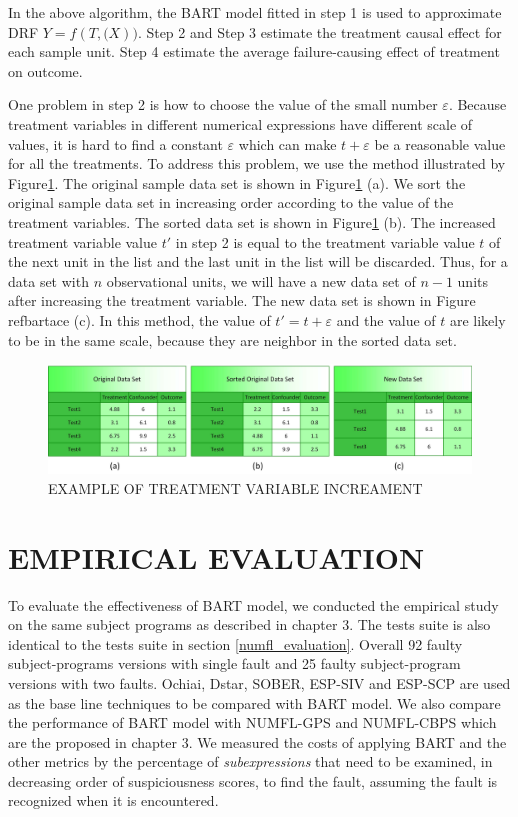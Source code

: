 In the above algorithm, the BART model fitted in step 1 is used to approximate DRF $Y=f(T,\pmb(X))$. Step 2 and Step 3 estimate the treatment causal effect for each sample unit. Step 4 estimate the average failure-causing effect of treatment on outcome.

One problem in step 2 is how to choose the value of the small number $\varepsilon $. Because treatment variables in different numerical expressions have different scale of values, it is hard to find a constant $\varepsilon$ which can make $t+\varepsilon$ be a reasonable value for all the treatments. To address this problem, we use the method illustrated by Figure\ref{bartace}.  The original sample data set is shown in Figure\ref{bartace} (a).  We sort the original sample data set in increasing order according to the value of the treatment variables. The sorted data set is shown in Figure\ref{bartace} (b). The increased treatment variable value $t'$ in step 2 is equal to the treatment variable value $t$ of the next unit in the list and the last unit in the list will be discarded. Thus,  for a data set with $n$ observational units, we will have a new data set of $n-1$ units after increasing the treatment variable. The new data set is shown in Figure ref{bartace} (c). In this method, the value of $t'=t+\varepsilon$ and the value of $t$ are likely to be in the same scale, because they are neighbor in the sorted data set. 

\begin{figure}[!thpb]
\centering
\includegraphics[width=1\textwidth]{chapter4_BART_ACE.pdf}
\caption{EXAMPLE OF TREATMENT VARIABLE INCREAMENT}
\label{bartace}
\end{figure}

\section{EMPIRICAL EVALUATION}\label{BARTevaluation}%

To evaluate the effectiveness of BART model, we conducted the empirical study on the same subject programs as described in chapter 3.  The tests suite is also identical to the tests suite in section \ref{numfl_evaluation}.  Overall 92 faulty subject-programs versions with single fault and 25 faulty subject-program versions with two faults. Ochiai, Dstar, SOBER, ESP-SIV and ESP-SCP are used as the base line techniques to be compared with BART model. We also compare the performance of BART model with NUMFL-GPS and NUMFL-CBPS which are the proposed in chapter 3. We measured the costs of applying BART and the other metrics by the percentage of {\it subexpressions} that need to be examined, in decreasing order of suspiciousness scores, to find the fault, assuming the fault is recognized when it is encountered.

